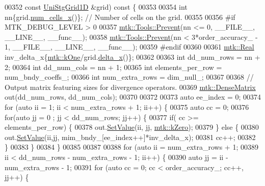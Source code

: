 \begin{DoxyCode}
{{00352   \textcolor{keyword}{const} \hyperlink{classmtk_1_1UniStgGrid1D}{UniStgGrid1D} &grid)\textcolor{keyword}{ const }\{
00353 
00354   \textcolor{keywordtype}{int} nn\{grid.\hyperlink{classmtk_1_1UniStgGrid1D_af1b3729d8afa07be5b2775ed68015b80}{num\_cells\_x}()\}; \textcolor{comment}{// Number of cells on the grid.}
00355 
00356 \textcolor{preprocessor}{  #if MTK\_DEBUG\_LEVEL > 0}
00357   \hyperlink{classmtk_1_1Tools_a332324c6f25e66be9dff48c5987a3b9f}{mtk::Tools::Prevent}(nn <= 0, \_\_FILE\_\_, \_\_LINE\_\_, \_\_func\_\_);
00358   \hyperlink{classmtk_1_1Tools_a332324c6f25e66be9dff48c5987a3b9f}{mtk::Tools::Prevent}(nn < 3*order\_accuracy\_ - 1, \_\_FILE\_\_, \_\_LINE\_\_, \_\_func\_\_);
00359 \textcolor{preprocessor}{  #endif}
00360 
00361   \hyperlink{group__c01-roots_gac080bbbf5cbb5502c9f00405f894857d}{mtk::Real} inv\_delta\_x\{\hyperlink{group__c01-roots_ga26407c24d43b6b95480943340d285c71}{mtk::kOne}/grid.\hyperlink{classmtk_1_1UniStgGrid1D_a6e7173b01241632cf509496d66b9f74c}{delta\_x}()\};
00362 
00363   \textcolor{keywordtype}{int} dd\_num\_rows = nn + 2;
00364   \textcolor{keywordtype}{int} dd\_num\_cols = nn + 1;
00365   \textcolor{keywordtype}{int} elements\_per\_row = num\_bndy\_coeffs\_;
00366   \textcolor{keywordtype}{int} num\_extra\_rows = dim\_null\_;
00367 
00368   \textcolor{comment}{// Output matrix featuring sizes for divergence operators.}
00369   \hyperlink{classmtk_1_1DenseMatrix}{mtk::DenseMatrix} out(dd\_num\_rows, dd\_num\_cols);
00370 
00372 
00373   \textcolor{keyword}{auto} ee\_index = 0;
00374   \textcolor{keywordflow}{for} (\textcolor{keyword}{auto} ii = 1; ii < num\_extra\_rows + 1; ii++) \{
00375     \textcolor{keyword}{auto} cc = 0;
00376     \textcolor{keywordflow}{for}(\textcolor{keyword}{auto} jj = 0 ; jj < dd\_num\_rows; jj++) \{
00377       \textcolor{keywordflow}{if}( cc >= elements\_per\_row) \{
00378         out.\hyperlink{classmtk_1_1DenseMatrix_a784ce5784109ac86bfb9d8562b334b13}{SetValue}(ii, jj, \hyperlink{group__c01-roots_ga59a451a5fae30d59649bcda274fea271}{mtk::kZero});
00379       \} \textcolor{keywordflow}{else} \{
00380         out.\hyperlink{classmtk_1_1DenseMatrix_a784ce5784109ac86bfb9d8562b334b13}{SetValue}(ii,jj, mim\_bndy\_[ee\_index++]*inv\_delta\_x);
00381         cc++;
00382       \}
00383     \}
00384   \}
00385 
00387 
00388   \textcolor{keywordflow}{for} (\textcolor{keyword}{auto} ii = num\_extra\_rows + 1;
00389        ii < dd\_num\_rows - num\_extra\_rows - 1; ii++) \{
00390     \textcolor{keyword}{auto} jj = ii - num\_extra\_rows - 1;
00391     \textcolor{keywordflow}{for} (\textcolor{keyword}{auto} cc = 0; cc < order\_accuracy\_; cc++, jj++) \{
}}
\end{DoxyCode}
